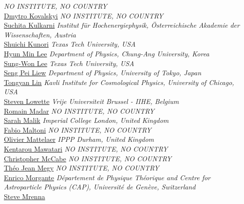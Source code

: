 \emph{NO INSTITUTE, NO COUNTRY}\\
\noindent\href{mailto:dmytro.kovalskyi@cern.ch}{Dmytro Kovalskyi} 
\emph{NO INSTITUTE, NO COUNTRY}\\
\noindent\href{mailto:suchita.kulkarni@oeaw.ac.at}{Suchita Kulkarni} 
\emph{Institut f\"ur Hochenergiephysik, \"Osterreichische Akademie der Wissenschaften, Austria}\\
\noindent\href{mailto:shuichi.kunori@ttu.edu}{Shuichi Kunori} 
\emph{Texas Tech University, USA}\\
\noindent\href{mailto:hminlee@cau.ac.kr}{Hyun Min Lee} 
\emph{Department of Physics, Chung-Ang University, Korea}\\
\noindent\href{mailto:sungwon.lee@cern.ch}{Sung-Won Lee} 
\emph{Texas Tech University, USA}\\
\noindent\href{mailto:spliew@lbl.gov}{Seng Pei Liew} 
\emph{Department of Physics, University of Tokyo, Japan}\\
\noindent\href{mailto:tongylin@gmail.com}{Tongyan Lin} 
\emph{Kavli Institute for Cosmological Physics, University of Chicago, USA}\\
\noindent\href{mailto:steven.lowette@cern.ch}{Steven Lowette} 
\emph{Vrije Universiteit Brussel - IIHE, Belgium}\\
\noindent\href{mailto:romain.madar@cern.ch}{Romain Madar} 
\emph{NO INSTITUTE, NO COUNTRY}\\
\noindent\href{mailto:sarah.malik@cern.ch}{Sarah Malik} 
\emph{Imperial College London, United Kingdom}\\
\noindent\href{mailto:Fabio.Maltoni@cern.ch}{Fabio Maltoni} 
\emph{NO INSTITUTE, NO COUNTRY}\\
\noindent\href{mailto:o.p.c.mattelaer@durham.ac.uk}{Olivier Mattelaer} 
\emph{IPPP Durham, United Kingdom}\\
\noindent\href{mailto:kentarou.mawatari@vub.ac.be}{Kentarou Mawatari} 
\emph{NO INSTITUTE, NO COUNTRY}\\
\noindent\href{mailto:c.mccabe@uva.nl}{Christopher McCabe} 
\emph{NO INSTITUTE, NO COUNTRY}\\
\noindent\href{mailto:megy@clermont.in2p3.fr}{Th\'eo Jean Megy} 
\emph{NO INSTITUTE, NO COUNTRY}\\
\noindent\href{mailto:enrico.morgante@unige.ch}{Enrico Morgante} 
\emph{D\'epartement de Physique Th\'eorique and Centre for Astroparticle Physics (CAP), Universit\'e de Gen\`eve, Switzerland}\\
\noindent\href{mailto:mrenna@fnal.gov}{Steve Mrenna} 
